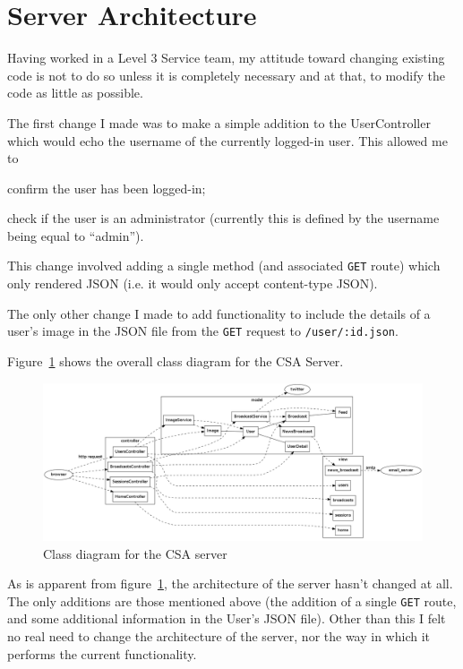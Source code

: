 \documentclass{article}
\begin{document}
\clearpage
\section{Server Architecture}
\label{sec:server}
Having worked in a Level 3 Service team, my attitude toward changing existing code is not
to do so unless it is completely necessary and at that, to modify the code as little as
possible.

The first change I made was to make a simple addition to the UserController which would
echo the username of the currently logged-in user. This allowed me to
\begin{inparaenum}
\item confirm the user has been logged-in;
\item check if the user is an administrator (currently this is defined by the username
being equal to ``admin'').
\end{inparaenum}

This change involved adding a single method (and associated \verb$GET$ route) which only rendered
JSON (i.e. it would only accept content-type JSON).

The only other change I made to add functionality to include the details of a user's
image in the JSON file from the \verb$GET$ request to \verb$/user/:id.json$. 

Figure~\ref{fig:server-uml-class} shows the overall class diagram for the CSA Server.

\begin{figure}[h]
\centering
\includegraphics[width=.95\textheight, angle=90]{img/server-uml-class.png}
\caption{Class diagram for the CSA server}
\label{fig:server-uml-class}
\end{figure}

As is apparent from figure~\ref{fig:server-uml-class}, the architecture of the server
hasn't changed at all. The only additions are those mentioned above (the addition of a
single \verb$GET$ route, and some additional information in the User's JSON file). Other
than this I felt no real need to change the architecture of the server, nor the way in
which it performs the current functionality.
\end{document}
